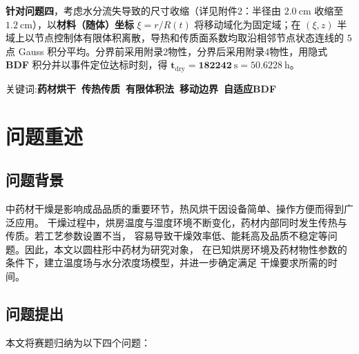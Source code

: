 \documentclass[12pt,a4paper]{ctexart}
\begin{document}
\textbf{针对问题四}，考虑水分流失导致的尺寸收缩（详见附件2：半径由 $2.0\ \mathrm{cm}$ 收缩至
$1.2\ \mathrm{cm}$），以\textbf{材料（随体）坐标} $\xi=r/R(t)$ 将移动域化为固定域；在 $(\xi,z)$ 半域上以节点控制体有限体积离散，导热和传质面系数均取沿相邻节点状态连线的 $5$ 点 Gauss 积分平均。分界前采用附录2物性，分界后采用附录4物性，用隐式 \textbf{BDF} 积分并以事件定位达标时刻，得
$\mathbf{t_{\mathrm{dry}}=182242\ \mathrm{s}=50.6228\ \mathrm{h}}$。

\medskip
关键词:\textbf{药材烘干~传热传质~有限体积法~移动边界~自适应BDF}

\vfill
\clearpage


\renewcommand{\thesection}{\chinese{section}}
\renewcommand{\thesubsection}{\arabic{section}.\arabic{subsection}}

\section{问题重述}
\subsection{问题背景}

中药材干燥是影响成品品质的重要环节，热风烘干因设备简单、操作方便而得到广泛应用。
干燥过程中，烘房温度与湿度环境不断变化，药材内部同时发生传热与传质。若工艺参数设置不当，
容易导致干燥效率低、能耗高及品质不稳定等问题。因此，本文以圆柱形中药材为研究对象，
在已知烘房环境及药材物性参数的条件下，建立温度场与水分浓度场模型，并进一步确定满足
干燥要求所需的时间。

\subsection{问题提出}

本文将赛题归纳为以下四个问题：
\end{document}

